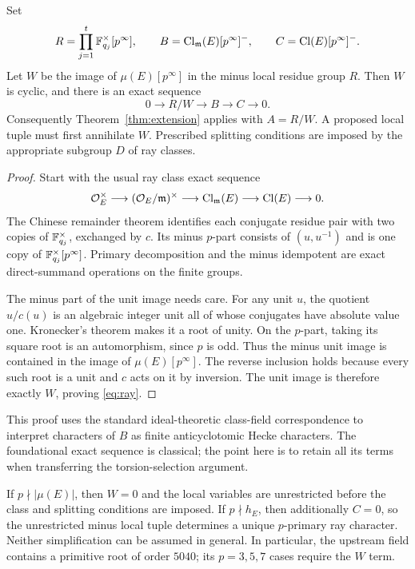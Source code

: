 \begin{theorem}\label{thm:ray}
Set
\[
 R=\prod_{j=1}^t\mathbb F_{q_j}^{\times}[p^\infty],\qquad
 B=\operatorname{Cl}_{\mathfrak m}(E)[p^\infty]^{-},\qquad
 C=\operatorname{Cl}(E)[p^\infty]^{-}.
\]
Let $W$ be the image of $\mu(E)[p^\infty]$ in the minus local residue group $R$. Then $W$ is cyclic, and there is an exact sequence
\begin{equation}\label{eq:ray}
 0\longrightarrow R/W\longrightarrow B\longrightarrow C\longrightarrow0.
\end{equation}
Consequently Theorem~\ref{thm:extension} applies with $A=R/W$. A proposed local tuple must first annihilate $W$. Prescribed splitting conditions are imposed by the appropriate subgroup $D$ of ray classes.
\end{theorem}

\begin{proof}
Start with the usual ray class exact sequence
\[
 \mathcal O_E^\times\longrightarrow
 (\mathcal O_E/\mathfrak m)^\times\longrightarrow
 \operatorname{Cl}_{\mathfrak m}(E)\longrightarrow\operatorname{Cl}(E)\longrightarrow0.
\]
The Chinese remainder theorem identifies each conjugate residue pair with two copies of $\mathbb F_{q_j}^\times$, exchanged by $c$. Its minus $p$-part consists of $(u,u^{-1})$ and is one copy of $\mathbb F_{q_j}^\times[p^\infty]$. Primary decomposition and the minus idempotent are exact direct-summand operations on the finite groups.

The minus part of the unit image needs care. For any unit $u$, the quotient $u/c(u)$ is an algebraic integer unit all of whose conjugates have absolute value one. Kronecker's theorem makes it a root of unity. On the $p$-part, taking its square root is an automorphism, since $p$ is odd. Thus the minus unit image is contained in the image of $\mu(E)[p^\infty]$. The reverse inclusion holds because every such root is a unit and $c$ acts on it by inversion. The unit image is therefore exactly $W$, proving \eqref{eq:ray}.
\end{proof}

This proof uses the standard ideal-theoretic class-field correspondence to interpret characters of $B$ as finite anticyclotomic Hecke characters. The foundational exact sequence is classical; the point here is to retain all its terms when transferring the torsion-selection argument.\cite{milne}

If $p\nmid|\mu(E)|$, then $W=0$ and the local variables are unrestricted before the class and splitting conditions are imposed. If $p\nmid h_E$, then additionally $C=0$, so the unrestricted minus local tuple determines a unique $p$-primary ray character. Neither simplification can be assumed in general. In particular, the upstream field contains a primitive root of order $5040$; its $p=3,5,7$ cases require the $W$ term.

